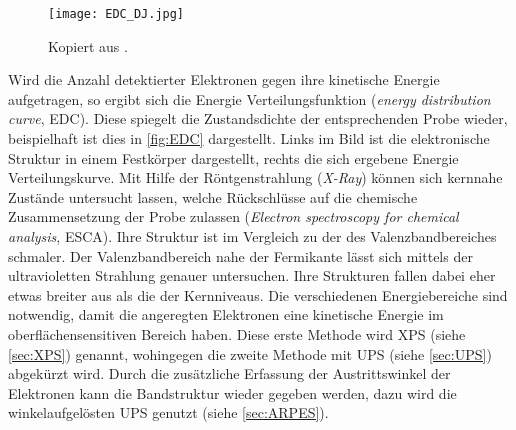         \begin{figure}
            \centering
            \texttt{[image: EDC\_DJ.jpg]}
            \caption{Kopiert aus \cite{oura_surface_2003}.}
            \label{fig:EDC}
        \end{figure}
        Wird die Anzahl detektierter Elektronen gegen ihre kinetische Energie aufgetragen, so ergibt sich die Energie Verteilungsfunktion (\textit{energy distribution curve}, EDC).
        Diese spiegelt die Zustandsdichte der entsprechenden Probe wieder, beispielhaft ist dies in \autoref{fig:EDC} dargestellt.
        Links im Bild ist die elektronische Struktur in einem Festkörper dargestellt, rechts die sich ergebene Energie Verteilungskurve.
        Mit Hilfe der Röntgenstrahlung (\textit{X-Ray}) können sich kernnahe Zustände untersucht lassen, welche Rückschlüsse auf die chemische Zusammensetzung der Probe zulassen (\textit{Electron spectroscopy for chemical analysis}, ESCA).
        Ihre Struktur ist im Vergleich zu der des Valenzbandbereiches schmaler.
        Der Valenzbandbereich nahe der Fermikante lässt sich mittels der ultravioletten Strahlung genauer untersuchen.
        Ihre Strukturen fallen dabei eher etwas breiter aus als die der Kernniveaus.
        Die verschiedenen Energiebereiche sind notwendig, damit die angeregten Elektronen eine kinetische Energie im oberflächensensitiven Bereich haben.
        Diese erste Methode wird XPS (siehe \autoref{sec:XPS}) genannt, wohingegen die zweite Methode mit UPS (siehe \autoref{sec:UPS}) abgekürzt wird.
        Durch die zusätzliche Erfassung der Austrittswinkel der Elektronen kann die Bandstruktur wieder gegeben werden, dazu wird die winkelaufgelösten UPS genutzt (siehe \autoref{sec:ARPES}).
        
